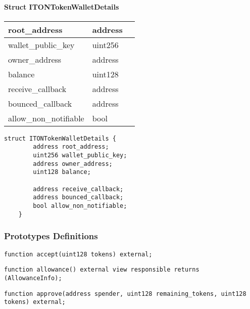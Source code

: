 \paragraph{Struct ITONTokenWalletDetails}


\ifsoltables
\noindent\begin{tabular}{|l|l|p{6cm}|}\hline
root\_{}address & address & \\\hline
wallet\_{}public\_{}key & uint256 & \\\hline
owner\_{}address & address & \\\hline
balance & uint128 & \\\hline
receive\_{}callback & address & \\\hline
bounced\_{}callback & address & \\\hline
allow\_{}non\_{}notifiable & bool & \\\hline
\end{tabular}
\fi


\begin{lstlisting}[firstnumber=8]
    struct ITONTokenWalletDetails {
        address root_address;
        uint256 wallet_public_key;
        address owner_address;
        uint128 balance;

        address receive_callback;
        address bounced_callback;
        bool allow_non_notifiable;
    }
\end{lstlisting}

\subsubsection{Prototypes Definitions}

\vspace{2cm}

\begin{lstlisting}[firstnumber=23]
    function accept(uint128 tokens) external;
\end{lstlisting}
\vspace{2cm}

\begin{lstlisting}[firstnumber=26]
    function allowance() external view responsible returns (AllowanceInfo);
\end{lstlisting}
\vspace{2cm}

\begin{lstlisting}[firstnumber=27]
    function approve(address spender, uint128 remaining_tokens, uint128 tokens) external;
\end{lstlisting}
\vspace{2cm}

